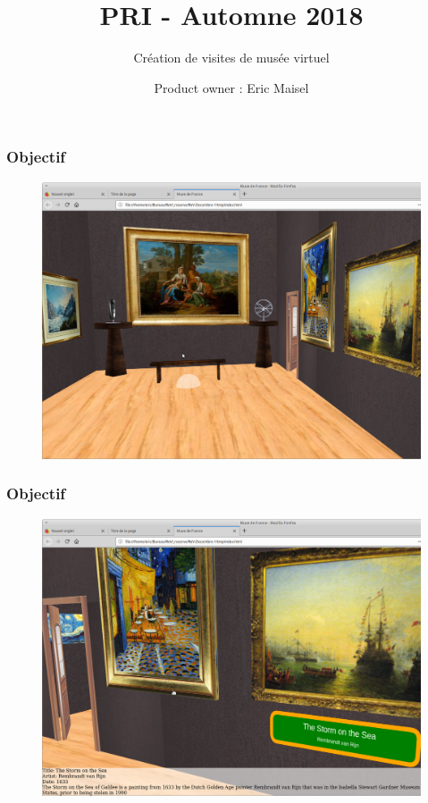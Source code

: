 \documentclass[11pt]{beamer}
\begin{document}
	\author{Product owner : Eric Maisel}\label{key}
	\title{PRI - Automne 2018}
	\subtitle{Création de visites  de musée virtuel}
	\date{}
	\begin{frame}[plain]
	\maketitle
\end{frame}

\begin{frame}
\frametitle{Objectif}
\begin{block}{}
	\begin{figure}
		\centering
		\includegraphics[width=0.9\linewidth]{ima2.jpg}
	\end{figure}
\end{block}
\end{frame}

\begin{frame}
\frametitle{Objectif}
\begin{block}{}
	\begin{figure}
		\centering
		\includegraphics[width=0.9\linewidth]{ima1.jpg}
	\end{figure}
\end{block}
\end{frame}
\end{document}
